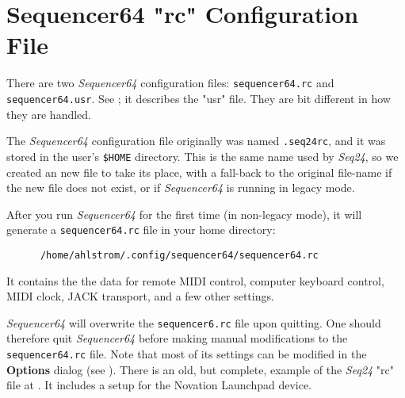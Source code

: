 %
%
%

\section{Sequencer64 "rc" Configuration File}
\label{sec:seq64_rc_file}

   There are two \textsl{Sequencer64} configuration files:
   \texttt{sequencer64.rc} and \texttt{sequencer64.usr}.
   See ; it describes the "usr" file.
   They are bit different in how they are handled.

   \index{[sequencer64.rc]}   %
   The \textsl{Sequencer64} configuration file originally was
   named \texttt{.seq24rc},
   and it was stored in the user's \texttt{\$HOME} directory.
   This is the same name used by \textsl{Seq24}, so we created an new file
   to take its place, with a fall-back to the original file-name if the new
   file does not exist, or if \textsl{Sequencer64} is running in
   legacy mode.

   After you run \textsl{Sequencer64} for the first time (in non-legacy
   mode), it will generate a \texttt{sequencer64.rc} file in your home
   directory:

   \begin{verbatim}
      /home/ahlstrom/.config/sequencer64/sequencer64.rc
   \end{verbatim}

   It contains the the data for remote MIDI control, computer keyboard
   control, MIDI clock, JACK transport, and a few other settings.

   \textsl{Sequencer64} will overwrite the \texttt{sequencer6.rc} file upon
   quitting.  One should therefore quit \textsl{Sequencer64} before making
   manual modifications to the \texttt{sequencer64.rc} file.  Note that most of
   its settings can be modified in the \textbf{Options} dialog
   (see ).
   There is an old, but complete, example of the \textsl{Seq24}
   "rc" file at \cite{seq24launchpadmapper}.  It includes a setup for the
   Novation Launchpad device.

